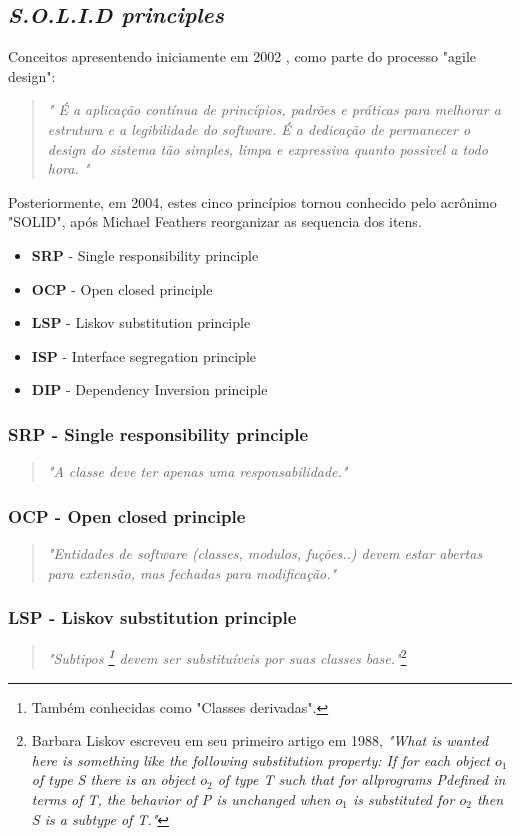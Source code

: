 \documentclass[12pt]{article}
\begin{document}
\subsection{\textit{S.O.L.I.D principles}} \label{sec:solid}

 Conceitos apresentendo iniciamente em 2002 \cite{ROBERT_MARTIN_AGILE_SW_DEV_PPP}, como parte do processo "agile design":
 
 \begin{quote}
\textit{" É a aplicação contínua de princípios, padrões e práticas para melhorar a estrutura e a legibilidade do software. É a dedicação de permanecer o design do sistema tão simples, limpa e expressiva quanto possivel a todo hora. "}
 \end{quote}

 Posteriormente, em 2004, estes cinco princípios tornou conhecido pelo acrônimo "SOLID", após Michael Feathers reorganizar as sequencia dos itens. 

\begin{itemize}
	\item \textbf{SRP} - Single responsibility principle
	\item \textbf{OCP} - Open closed principle
	\item \textbf{LSP} - Liskov substitution principle
	\item \textbf{ISP} - Interface segregation principle
	\item \textbf{DIP} - Dependency Inversion principle
\end{itemize}

\subsubsection{SRP - Single responsibility principle}
\begin{quote}
	\textit{"A classe deve ter apenas uma responsabilidade."}	
\end{quote}
\subsubsection{OCP - Open closed principle}
\begin{quote}
	\textit{"Entidades de software (classes, modulos, fuções..) devem estar abertas para extensão, mas fechadas para modificação."}	
\end{quote}
\subsubsection{LSP - Liskov substitution principle}
\begin{quote}
	\textit{"Subtipos \footnote{Também conhecidas como "Classes derivadas".} devem ser substituíveis por suas classes base."}\footnote{Barbara Liskov escreveu em seu primeiro artigo em 1988, \textit{"What is wanted here is something like the following substitution property: If for each object $ o_1 $ of type S there is an object $ o_2 $ of type T such that for allprograms Pdefined in terms of T, the behavior of P is unchanged when $ o_1 $ is substituted for $ o_2 $ then S is a subtype of T."} }	
\end{quote}
\end{document}
